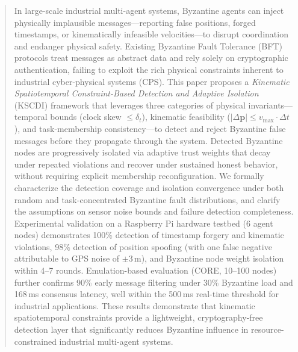 \documentclass[manuscript,screen,review]{acmart}
\begin{document}
\begin{abstract}
In large-scale industrial multi-agent systems, Byzantine agents can inject physically implausible messages---reporting false positions, forged timestamps, or kinematically infeasible velocities---to disrupt coordination and endanger physical safety. Existing Byzantine Fault Tolerance (BFT) protocols treat messages as abstract data and rely solely on cryptographic authentication, failing to exploit the rich physical constraints inherent to industrial cyber-physical systems (CPS). This paper proposes a \textit{Kinematic Spatiotemporal Constraint-Based Detection and Adaptive Isolation} (KSCDI) framework that leverages three categories of physical invariants---temporal bounds (clock skew $\leq \delta_t$), kinematic feasibility ($|\Delta\mathbf{p}| \leq v_{\max} \cdot \Delta t$), and task-membership consistency---to detect and reject Byzantine false messages before they propagate through the system. Detected Byzantine nodes are progressively isolated via adaptive trust weights that decay under repeated violations and recover under sustained honest behavior, without requiring explicit membership reconfiguration. We formally characterize the detection coverage and isolation convergence under both random and task-concentrated Byzantine fault distributions, and clarify the assumptions on sensor noise bounds and failure detection completeness. Experimental validation on a Raspberry Pi hardware testbed (6 agent nodes) demonstrates 100\% detection of timestamp forgery and kinematic violations, 98\% detection of position spoofing (with one false negative attributable to GPS noise of $\pm$3\,m), and Byzantine node weight isolation within 4--7 rounds. Emulation-based evaluation (CORE, 10--100 nodes) further confirms 90\% early message filtering under 30\% Byzantine load and 168\,ms consensus latency, well within the 500\,ms real-time threshold for industrial applications. These results demonstrate that kinematic spatiotemporal constraints provide a lightweight, cryptography-free detection layer that significantly reduces Byzantine influence in resource-constrained industrial multi-agent systems.
\end{abstract}

\end{document}
